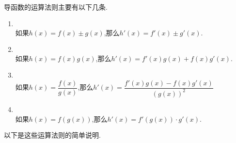 \documentclass{ctexart}
\begin{document}
\begin{theorem}[0A.1.2]
    导函数的运算法则主要有以下几条.
    \begin{enumerate}[label=\tbf{\roman*.},topsep=0pt,parsep=0pt,itemsep=0pt,partopsep=0pt]
        \item {}\\如果$h(x)=f(x)\pm g(x)$,那么$h'(x)=f'(x)\pm g'(x)$.
        \item {}\\如果$h(x)=f(x)g(x)$,那么$h'(x)=f'(x)g(x)+f(x)g'(x)$.
        \item {}\\如果$h(x)=\dfrac{f(x)}{g(x)}$,那么$h'(x)=\dfrac{f'(x)g(x)-f(x)g'(x)}{(g(x))^2}$
        \item {}\\如果$h(x)=f(g(x))$,那么$h'(x)=f'(g(x))\cdot g'(x)$.
    \end{enumerate}
\end{theorem}
以下是这些运算法则的简单说明.
\end{document}
